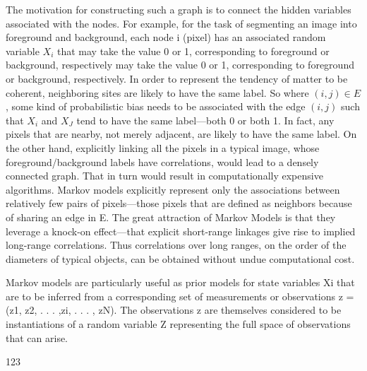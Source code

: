 The motivation for constructing such a graph is to connect the hidden variables associated with the nodes. For example, for the task of segmenting an image into foreground and background, each node i (pixel) has an associated random variable $X_i$ that may take the value 0 or 1, corresponding to foreground or background, respectively may take the value 0 or 1, corresponding to foreground or background, respectively. In order
to represent the tendency of matter to be coherent, neighboring sites are likely to have the
same label. So where $(i, j) \in E$, some kind of probabilistic bias needs to be associated with
the edge $(i,j)$ such that $X_i$ and $X_J$ tend to have the same label—both 0 or both 1. In fact, any
pixels that are nearby, not merely adjacent, are likely to have the same label. On the other
hand, explicitly linking all the pixels in a typical image, whose foreground/background
labels have correlations, would lead to a densely connected graph. That in turn would
result in computationally expensive algorithms. Markov models explicitly represent only
the associations between relatively few pairs of pixels—those pixels that are defined as
neighbors because of sharing an edge in E. The great attraction of Markov Models is that
they leverage a knock-on effect—that explicit short-range linkages give rise to implied
long-range correlations. Thus correlations over long ranges, on the order of the diameters of typical objects, can be obtained without undue computational cost.

Markov models are particularly useful as prior models for state variables Xi that are to
be inferred from a corresponding set of measurements or observations z = (z1, z2, . . . ,zi, . . . , zN). The observations z are themselves considered to be instantiations of a random variable Z representing the full space of observations that can arise.

123